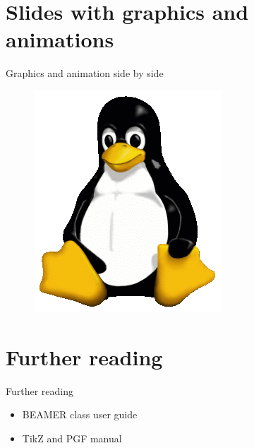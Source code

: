 \documentclass[11pt,t]{beamer}
\begin{document}
\section{Slides with graphics and animations}
\begin{frame}{Graphics and animation side by side}
	\begin{figure}
		\begin{minipage}[b]{0.49\linewidth}
			\centering
			\includegraphics[width=.3\textwidth,natwidth=265,natheight=314]{Tux.png}
		\end{minipage}
		\hfill	
		\begin{minipage}[b]{0.5\linewidth}
			\centering
		\end{minipage}
	\end{figure}
\end{frame}
\section{Further reading}
\begin{frame}[t]{Further reading}
	\begin{itemize}
		\item BEAMER class user guide
		\item TikZ and PGF manual
	\end{itemize}
\end{frame}
\end{document}
